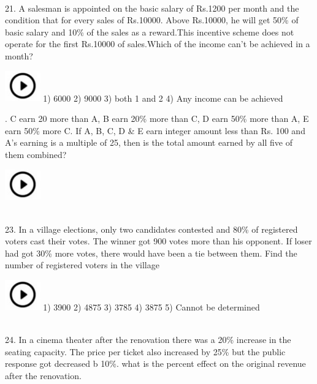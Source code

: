 \documentclass{article}
\begin{document}
\noindent 

\noindent \\
21. A salesman is appointed on the basic salary of Rs.1200 per month and the condition that for every sales of Rs.10000. Above Rs.10000, he will get 50\% of basic salary and 10\% of the sales as a reward.This incentive scheme does not operate for the first Rs.10000 of sales.Which of the income can't be achieved in a month?

\noindent 

\noindent  \includegraphics*[width=0.60in, height=0.52in]{images/image1}  1) 6000                    2) 9000             3) both 1 and 2             4) Any income can be achieved

\noindent 

\noindent 

. C earn 20 more than A, B earn 20\% more than C, D earn 50\% more than A, E earn 50\% more C. If A, B, C, D \& E earn integer amount less than Rs. 100 and A's earning is a multiple of 25, then is the total amount earned by all five of them combined?

\noindent   \includegraphics*[width=0.60in, height=0.52in]{images/image1} 

\noindent \\
 

23. In a village elections, only two candidates contested and 80\% of registered voters cast their  votes. The winner got 900 votes more than his opponent. If loser had got 30\% more votes, there  would have been a tie between them. Find the number of registered voters in the village

\noindent 

\noindent   \includegraphics*[width=0.60in, height=0.52in]{images/image1}  1) 3900                    2) 4875             3) 3785             4) 3875             5) Cannot be determined

\noindent 

\noindent \\
 24. In a cinema theater after the renovation there was a 20\% increase in the seating capacity. The price per ticket also increased by 25\% but the public response got decreased b 10\%. what is the percent effect on the original revenue after the renovation. \\
 
\end{document}
